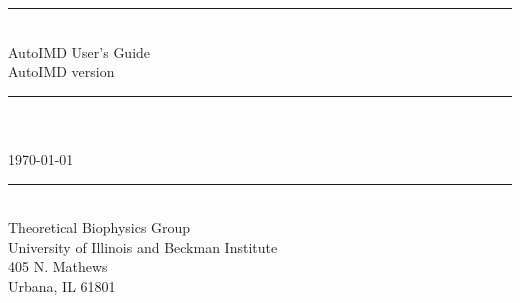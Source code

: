 
\thispagestyle{empty}

\vspace*{0.3in}

\begin{centering}
  \rule{6in}{0.04in}				\\	\vspace{0.25in}
  {\Huge AutoIMD User's Guide}		\\	\vspace{0.25in}
  {\Large AutoIMD version \autoimdversion}		\\	\vspace{0.20in}

  \rule{6in}{0.04in}				\\	\vspace{0.25in}
  {\Large \autoimdauthors}			\\	\vspace{0.20in}
  \today					\\	\vspace{0.20in}
  \rule{6in}{0.04in}				\\	\vspace{0.25in}
  {\large       Theoretical Biophysics Group}                  \\ 
  {\large       University of Illinois and Beckman Institute}  \\ 
  {\large       405 N. Mathews}                                \\ 
  {\large       Urbana, IL  61801}                             \\
\end{centering}
\vspace{1in}

